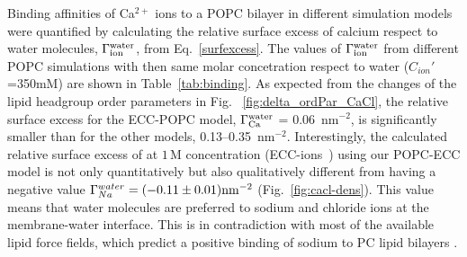 \documentclass[aip,jcp,twocolumn]{revtex4}
\begin{document}
Binding affinities of Ca$^{2+}$ ions to a POPC bilayer in different simulation models were quantified by calculating the relative surface excess of calcium respect to water molecules, $\Gamma_{\rm ion}^{\rm water}$, from Eq.~\ref{surfexcess}.
The values of $\Gamma_{\rm ion}^{\rm water}$
from different POPC simulations with then same molar concetration respect
to water ($C_{ion}'$=350mM) are shown in Table~\ref{tab:binding}.
As expected from the changes of the lipid headgroup order parameters in Fig.~ \ref{fig:delta_ordPar_CaCl}, the relative surface excess for the ECC-POPC model, $\Gamma_{\rm Ca}^{\rm water}$ = 0.06~nm$^{-2}$, is significantly smaller than for the other models, 0.13--0.35~nm$^{-2}$.
Interestingly, the calculated relative surface excess of  at $1\,\mathrm{M}$ concentration (ECC-ions~\cite{Pluharova2014}) using our POPC-ECC model is not only quantitatively but also qualitatively different from  having a negative value $\Gamma_{Na}^{water} = (-0.11 \pm 0.01) \rm{nm}^{-2}$ (Fig.~\ref{fig:cacl-dens}). This value means that water molecules are preferred to sodium and chloride ions at the membrane-water interface.  This is in contradiction with most of the available lipid force fields, which predict a positive binding of sodium to PC lipid bilayers \cite{catte16}.
\end{document}
